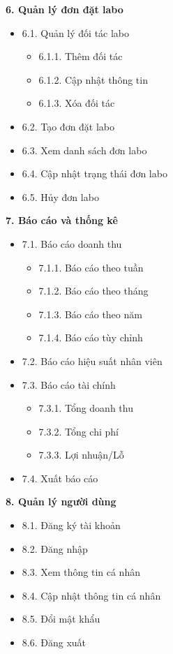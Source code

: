 \textbf{6. Quản lý đơn đặt labo}
\begin{itemize}
\item 6.1. Quản lý đối tác labo
    \begin{itemize}
    \item 6.1.1. Thêm đối tác
    \item 6.1.2. Cập nhật thông tin
    \item 6.1.3. Xóa đối tác
    \end{itemize}
\item 6.2. Tạo đơn đặt labo
\item 6.3. Xem danh sách đơn labo
\item 6.4. Cập nhật trạng thái đơn labo
\item 6.5. Hủy đơn labo
\end{itemize}

\textbf{7. Báo cáo và thống kê}
\begin{itemize}
\item 7.1. Báo cáo doanh thu
    \begin{itemize}
    \item 7.1.1. Báo cáo theo tuần
    \item 7.1.2. Báo cáo theo tháng
    \item 7.1.3. Báo cáo theo năm
    \item 7.1.4. Báo cáo tùy chỉnh
    \end{itemize}
\item 7.2. Báo cáo hiệu suất nhân viên
\item 7.3. Báo cáo tài chính
    \begin{itemize}
    \item 7.3.1. Tổng doanh thu
    \item 7.3.2. Tổng chi phí
    \item 7.3.3. Lợi nhuận/Lỗ
    \end{itemize}
\item 7.4. Xuất báo cáo
\end{itemize}

\textbf{8. Quản lý người dùng}
\begin{itemize}
\item 8.1. Đăng ký tài khoản
\item 8.2. Đăng nhập
\item 8.3. Xem thông tin cá nhân
\item 8.4. Cập nhật thông tin cá nhân
\item 8.5. Đổi mật khẩu
\item 8.6. Đăng xuất
\end{itemize}

